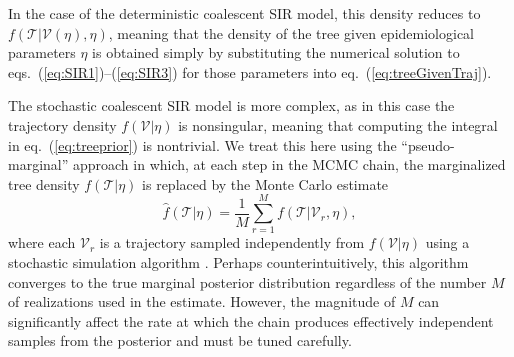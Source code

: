 \documentclass[12pt,titlepage]{article}
\newcommand{\St}{\mathcal{S}}
\newcommand{\It}{\mathcal{I}}
\newcommand{\traj}{\mathcal{V}}
\newcommand{\tree}{\mathcal{T}}
\begin{document}
In the case of the deterministic coalescent SIR model, this density
reduces to $f(\tree|\traj(\eta),\eta)$, meaning that the density of
the tree given epidemiological parameters $\eta$ is obtained simply by
substituting the numerical solution to
eqs.~(\ref{eq:SIR1})--(\ref{eq:SIR3}) for those parameters into
eq.~(\ref{eq:treeGivenTraj}).

The stochastic coalescent SIR model is more complex, as in this case
the trajectory density $f(\traj|\eta)$ is nonsingular, meaning that
computing the integral in eq.~(\ref{eq:treeprior}) is nontrivial. We
treat this here using the ``pseudo-marginal''
approach \citep{Beaumont:2003,Andrieu:2009} in which, at each step in
the MCMC chain, the marginalized tree density $f(\tree|\eta)$ is
replaced by the Monte Carlo estimate
\begin{equation}
\hat{f}(\tree|\eta)=\frac{1}{M}\sum_{r=1}^{M}f(\tree|\traj_r,\eta),
\end{equation}  
where each $\traj_r$ is a trajectory sampled independently from
$f(\traj|\eta)$ using a stochastic simulation algorithm
\citep{Sehl:2009aa}.  Perhaps counterintuitively, this algorithm
converges to the true marginal posterior distribution regardless of
the number $M$ of realizations used in the estimate.  However, the
magnitude of $M$ can significantly affect the rate at which the chain
produces effectively independent samples from the posterior and 
must be tuned carefully.




\end{document}
